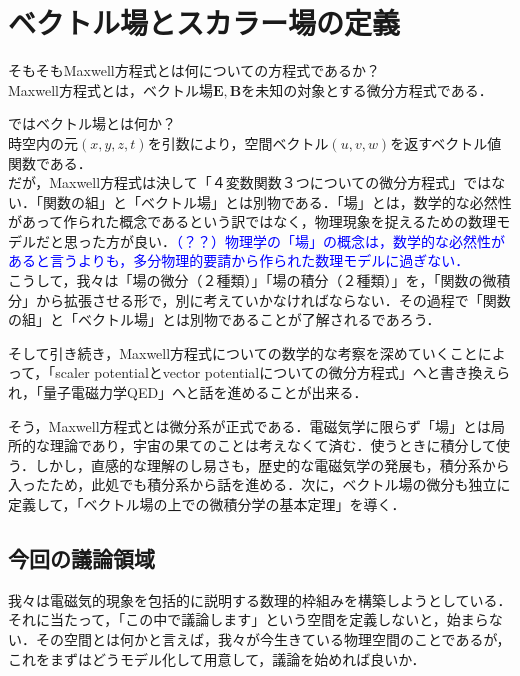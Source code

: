 \documentclass[uplatex, 12pt, a4paper]{jsarticle}
\begin{document}
\section{ベクトル場とスカラー場の定義}

そもそもMaxwell方程式とは何についての方程式であるか？\\
Maxwell方程式とは，ベクトル場$\mathbf{E,B}$を未知の対象とする微分方程式である．

ではベクトル場とは何か？\\
時空内の元$(x,y,z,t)$を引数により，空間ベクトル$(u,v,w)$を返すベクトル値関数である．\\
だが，Maxwell方程式は決して「４変数関数３つについての微分方程式」ではない．「関数の組」と「ベクトル場」とは別物である．「場」とは，数学的な必然性があって作られた概念であるという訳ではなく，物理現象を捉えるための数理モデルだと思った方が良い．\textcolor{blue}{（？？）物理学の「場」の概念は，数学的な必然性があると言うよりも，多分物理的要請から作られた数理モデルに過ぎない．}\\
こうして，我々は「場の微分（２種類）」「場の積分（２種類）」を，「関数の微積分」から拡張させる形で，別に考えていかなければならない．その過程で「関数の組」と「ベクトル場」とは別物であることが了解されるであろう．

そして引き続き，Maxwell方程式についての数学的な考察を深めていくことによって，「scaler potentialとvector potentialについての微分方程式」へと書き換えられ，「量子電磁力学QED」へと話を進めることが出来る．

そう，Maxwell方程式とは微分系が正式である．電磁気学に限らず「場」とは局所的な理論であり，宇宙の果てのことは考えなくて済む．使うときに積分して使う．しかし，直感的な理解のし易さも，歴史的な電磁気学の発展も，積分系から入ったため，此処でも積分系から話を進める．次に，ベクトル場の微分も独立に定義して，「ベクトル場の上での微積分学の基本定理」を導く．

\subsection{今回の議論領域}

我々は電磁気的現象を包括的に説明する数理的枠組みを構築しようとしている．それに当たって，「この中で議論します」という空間を定義しないと，始まらない．その空間とは何かと言えば，我々が今生きている物理空間のことであるが，これをまずはどうモデル化して用意して，議論を始めれば良いか．
\end{document}
